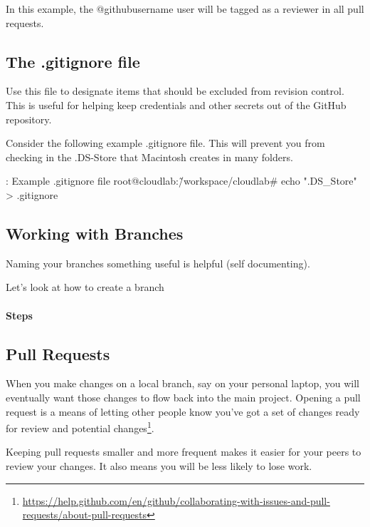 In this example, the @githubusername user will be tagged as a reviewer
in all pull requests.


\subsection{The .gitignore file}
\justify
Use this file to designate items that should be excluded from revision
control. This is useful for helping keep credentials and other secrets
out of the GitHub repository.

\justify
Consider the following example .gitignore file. This will prevent you
from checking in the .DS-Store that Macintosh creates in many folders.

\begin{mybox}{\thetcbcounter: Example .gitignore file}
      root@cloudlab:\~/workspace/cloudlab\# echo ".DS\_Store" > .gitignore
\end{mybox}

\subsection{Working with Branches}

Naming your branches something useful is helpful (self documenting).

Let's look at how to create a branch

\hypertarget{steps-3}{%
      \paragraph{Steps}\label{steps-3}}


\subsection{Pull Requests}

\justify
When you make changes on a local branch, say on your personal laptop,
you will eventually want those changes to flow back into the main
project. Opening a pull request is a means of letting other people know
you've got a set of changes ready for review and potential
changes\footnote{\url{https://help.github.com/en/github/collaborating-with-issues-and-pull-requests/about-pull-requests}}.

\justify
Keeping pull requests smaller and more frequent makes it easier for your
peers to review your changes. It also means you will be less likely to
lose work.

